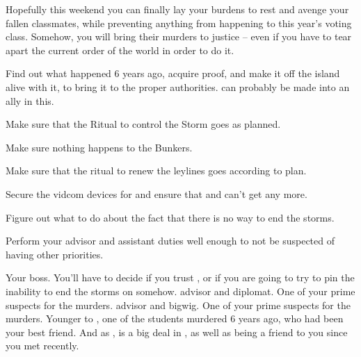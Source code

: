 \documentclass[char]{GL2020}
\begin{document}
Hopefully this weekend you can finally lay your burdens to rest and avenge your fallen classmates, while preventing anything from happening to this year's voting class. Somehow, you will bring their murders to justice -- even if you have to tear apart the current order of the world in order to do it.

\begin{itemz}[Goals]
	\item Find out what happened 6 years ago, acquire proof, and make it off the island alive with it, to bring it to the proper authorities. \cHeir{} can probably be made into an ally in this.
	\item Make sure that the Ritual to control the Storm goes as planned.
	\item Make sure nothing happens to the Bunkers.
	\item Make sure that the ritual to renew the leylines goes according to plan.
	\item Secure the vidcom devices for \pShip{} and ensure that \pTech{} and \pFarm{} can’t get any more.
	\item Figure out what to do about the fact that there is no way to end the storms.
	\item Perform your advisor and assistant duties well enough to not be suspected of having other priorities.
\end{itemz}

\begin{itemz}[Notes]
	\item 
\end{itemz}

\begin{contacts}
	\contact{\cHeadScientist{}} Your boss. You’ll have to decide if you trust \cHeadScientist{}, or if you are going to try to pin the inability to end the storms on \cHeadScientist{\them} somehow.
	\contact{\cDiplomat{}}  \pTech{} advisor and diplomat. One of your prime suspects for the murders.
	\contact{\cEvil{}} \pFarm{} advisor and bigwig. One of your prime suspects for the murders.
	\contact{\cHeir{}} Younger \cHeir{\sibling} to \cHeirSibling{}, one of the students murdered 6 years ago, who had been your best friend. And as \cHeir{\formal}, \cHeir{} is a big deal in \pTech{}, as well as being a friend to you since you met recently.  
\end{contacts}
\end{document}
